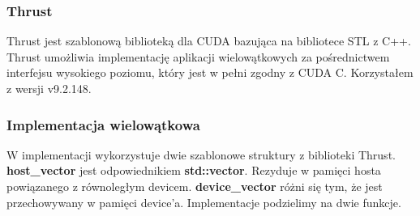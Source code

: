 \documentclass[14pt,twoside,a4paper]{article}
\theoremstyle{definition}
\begin{document}
\subsubsection{\large Thrust}
Thrust jest szablonową biblioteką dla CUDA bazująca na bibliotece STL z C++. Thrust umożliwia implementację aplikacji wielowątkowych za pośrednictwem interfejsu wysokiego poziomu, który jest w pełni zgodny z CUDA C. Korzystałem z wersji v9.2.148. \cite{thrust}


\subsubsection{\large Implementacja wielowątkowa}
W implementacji wykorzystuje dwie szablonowe struktury z biblioteki Thrust.
\textbf{host\_vector}\cite{thrust} jest odpowiednikiem \textbf{std::vector}. Rezyduje w pamięci hosta powiązanego z równoległym devicem. \textbf{device\_vector}\cite{thrust} różni się tym, że jest przechowywany w pamięci device'a. Implementacje podzielimy na dwie funkcje.\\
\bigskip
\end{document}

